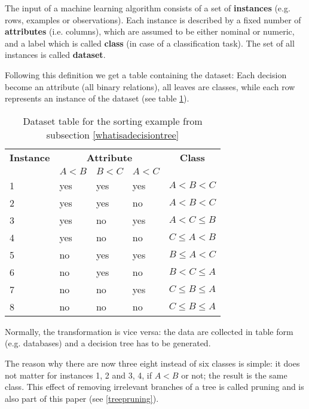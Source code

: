 \begin{definition}
    The input of a machine learning algorithm consists of a set of \textbf{instances} (e.g. rows, examples or observations). Each instance is described by a fixed number of \textbf{attributes} (i.e. columns), which are assumed to be either nominal or numeric, and a label which is called \textbf{class} (in case of a classification task). The set of all instances is called \textbf{dataset}.
\end{definition}

Following this definition we get a table containing the dataset: Each decision become an attribute (all binary relations), all leaves are classes, while each row represents an instance of the dataset (see table \ref{tab:decisiontable}).

\begin{table}[!h] \centering
\begin{tabular}{|l| l l l |l|} \hline
    \textbf{Instance} & \multicolumn{3}{c|}{\textbf{Attribute}} & \multicolumn{1}{c|}{\textbf{Class}}\\ 
    & $A<B$ & $B<C$ & $A<C$ &  \\ \hline
    1 & yes & yes & yes & $A < B < C$ \\ 
    2 & yes & yes & no & $A < B < C$ \\
    3 & yes & no & yes & $A < C \leq B$ \\
    4 & yes & no & no & $C \leq A < B$ \\
    5 & no & yes & yes & $B \leq A < C$ \\ 
    6 & no & yes & no & $B < C \leq A$ \\
    7 & no & no & yes & $C \leq B \leq A$ \\
    8 & no & no & no & $C \leq B \leq A$ \\ \hline
\end{tabular}
\caption{Dataset table for the sorting example from subsection \ref{whatisadecisiontree}}
\label{tab:decisiontable}
\end{table}

Normally, the transformation is vice versa: the data are collected in table form (e.g. databases) and a decision tree has to be generated. 

The reason why there are now three eight instead of six classes is simple: it does not matter for instances 1, 2 and 3, 4, if $A<B$ or not; the result is the same class. This effect of removing irrelevant branches of a tree is called pruning and is also part of this paper (see \ref{treepruning}). 


